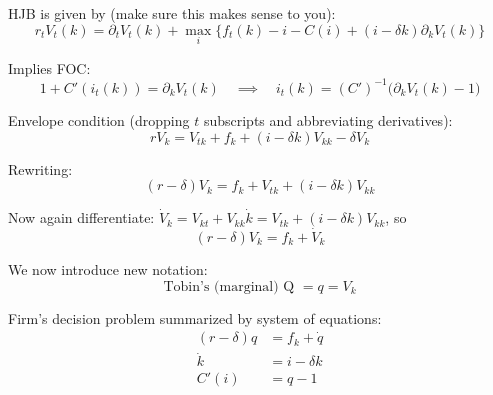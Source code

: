 \documentclass[11pt, aspectratio=169]{beamer}
\newenvironment{witemize}{\itemize\addtolength{\itemsep}{10pt}}{\enditemize}
\begin{document}
\begin{frame}{}
\begin{witemize}
\item HJB is given by (make sure this makes sense to you): 
\begin{equation*}
	r_t V_t(k) = \partial_t V_t(k) + \max_i \bigg\{ f_t(k) - i - C(i) + (i - \delta k) \partial_k V_t(k) \bigg\}
\end{equation*}

\item Implies FOC:
\begin{equation*}
	1 + C'(i_t(k)) = \partial_k V_t(k) 
	\quad \implies \quad
	i_t(k) = (C')^{-1} \Big( \partial_k V_t(k) - 1 \Big)
\end{equation*}

\item Envelope condition (dropping $t$ subscripts and abbreviating derivatives):
\begin{equation*}
	rV_k = V_{tk} + f_k + (i-\delta k) V_{kk} - \delta V_k
\end{equation*}


\end{witemize}
\end{frame}


\begin{frame}{}
\begin{witemize}
\item Rewriting:
\begin{equation*}
	(r - \delta) V_k = f_k + V_{tk} + (i-\delta k) V_{kk} 
\end{equation*}

\item Now again differentiate: $\dot V_k = V_{kt} + V_{kk} \dot k = V_{tk} + (i-\delta k) V_{kk}$, so
\begin{equation*}
	(r - \delta) V_k = f_k + \dot V_k 
\end{equation*}

\item We now introduce new notation:
\begin{equation*}
	\text{Tobin's (marginal) Q } = q = V_k
\end{equation*}

\item Firm's decision problem summarized by system of equations:
\begin{align*}
	(r - \delta) q &= f_k + \dot q \\
	\dot k &= i - \delta k \\
	C'(i) &= q - 1
\end{align*}

\end{witemize}
\end{frame}
\end{document}
